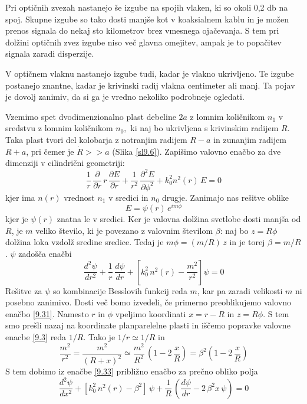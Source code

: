 Pri optičnih zvezah nastanejo še izgube na spojih vlaken, ki so okoli
0,2 db na spoj. Skupne izgube so tako dosti manjše kot v koaksialnem
kablu in je možen prenos signala do nekaj sto kilometrov brez vmesnega
ojačevanja. S tem pri dolžini optičnih zvez izgube niso več glavna
omejitev, ampak je to popačitev signala zaradi disperzije.

V optičnem vlaknu nastanejo izgube tudi, kadar je vlakno ukrivljeno.
Te izgube postanejo znantne, kadar je krivinski radij vlakna centimeter
ali manj. Ta pojav je dovolj zanimiv, da si ga je vredno nekoliko
podrobneje ogledati.

Vzemimo spet dvodimenzionalno plast debeline $2a$ z lomnim količnikom
$n_{1}$ v sredstvu z lomnim količnikom $n_{0},$ ki naj bo ukrivljena
s krivinskim radijem $R$. Taka plast tvori del kolobarja z notranjim
radijem $R-a$ in zunanjim radijem $R+a$, pri čemer je $\dot{R}>>a$
(Slika \ref{sl9.6}). Zapišimo valovno enačbo za dve dimenziji v cilindrični
geometriji: 
\begin{equation}
\frac{1}{r}\,\frac{\partial}{\partial r}\, r\,\frac{\partial E}{\partial r}+\frac{1}{r^{2}}\,\frac{\partial^{2}E}{\partial\phi^{2}}+k_{0}^{2}n^{2}\left(r\right)\, E=0\label{9.31}
\end{equation}
 kjer ima $n\left(r\right)$ vrednost $n_{1}$ v sredici in $n_{0}$
drugje. Zanimajo nas rešitve oblike 
\begin{equation}
E=\psi\left(r\right)\, e^{im\phi}\label{9.32}
\end{equation}
 kjer je $\psi\left(r\right)$ znatna le v sredici. Ker je valovna
dolžina svetlobe dosti manjša od $R$, je $m$ veliko število, ki
je povezano z valovnim številom $\beta$: naj bo $z=R\phi$ dolžina
loka vzdolž sredine sredice. Tedaj je $m\phi=(m/R)\, z$ in je torej
$\beta=m/R$. $\psi$ zadošča enačbi 
\begin{equation}
\frac{d^{2}\psi}{dr^{2}}+\frac{1}{r}\,\frac{d\psi}{dr}+\left[k_{0}^{2}\, n^{2}\left(r\right)-\frac{m^{2}}{r^{2}}\right]\psi=0\label{9.33}
\end{equation}
 Rešitve za $\psi$ so kombinacije Besslovih funkcij reda $m$, kar
pa zaradi velikosti $m$ ni posebno zanimivo. Dosti več bomo izvedeli,
če primerno preoblikujemo valovno enačbo \ref{9.31}. Namesto $r$
in $\phi$ vpeljimo koordinati $x=r-R$ in $z=R\phi$. S tem smo prešli
nazaj na koordinate planparelelne plasti in iščemo popravke valovne
enacbe \ref{9.3} reda $1/R.$ Tako je $1/r\simeq1/R$ in 
\begin{equation}
\frac{m^{2}}{r^{2}}=\frac{m^{2}}{\left(R+x\right)^{2}}\simeq\frac{m^{2}}{R^{2}}\,\left(1-2\,\frac{x}{R}\right)=\beta^{2}\left(1-2\,\frac{x}{R}\right)\label{9.34}
\end{equation}
 S tem dobimo iz enačbe \ref{9.33} približno enačbo za prečno obliko
polja 
\begin{equation}
\frac{d^{2}\psi}{dx^{2}}+\left[k_{0}^{2}\, n^{2}\left(r\right)-\beta^{2}\right]\,\psi+\frac{1}{R}\,\left(\frac{d\psi}{dr}-2\,\beta^{2}x\,\psi\right)=0\label{9.35}
\end{equation}

